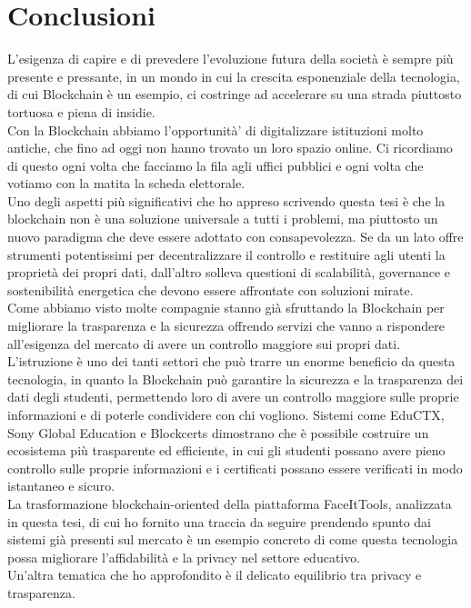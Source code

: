\chapter{Conclusioni}
L'esigenza di capire e di prevedere l'evoluzione futura della società è sempre più presente e pressante,
in un mondo in cui la crescita esponenziale della tecnologia, di cui Blockchain è un esempio, ci costringe ad accelerare su una strada piuttosto tortuosa e piena di insidie.
\\Con la Blockchain abbiamo l'opportunità' di digitalizzare istituzioni molto antiche, che fino ad oggi non hanno trovato un loro spazio online.
Ci ricordiamo di questo ogni volta che facciamo la fila agli uffici pubblici e ogni volta che votiamo con la matita la scheda elettorale.
\\Uno degli aspetti più significativi che ho appreso scrivendo questa tesi è che la blockchain non è una soluzione universale a tutti i problemi, ma piuttosto un nuovo paradigma che deve essere adottato con consapevolezza. 
Se da un lato offre strumenti potentissimi per decentralizzare il controllo e restituire agli utenti la proprietà dei propri dati, dall’altro solleva questioni di scalabilità, governance e sostenibilità energetica che devono essere affrontate con soluzioni mirate.
\\Come abbiamo visto molte compagnie stanno già sfruttando la Blockchain per migliorare la trasparenza e la sicurezza offrendo servizi che vanno a rispondere all'esigenza del mercato di avere un controllo maggiore sui propri dati.
\\L'istruzione è uno dei tanti settori che può trarre un enorme beneficio da questa tecnologia, in quanto la Blockchain può garantire la sicurezza e la trasparenza dei dati degli studenti, permettendo loro di avere un controllo maggiore sulle proprie informazioni e di poterle condividere con chi vogliono.
Sistemi come EduCTX, Sony Global Education e Blockcerts dimostrano che è possibile costruire un ecosistema più trasparente ed efficiente, in cui gli studenti possano avere pieno controllo sulle proprie informazioni e i certificati possano essere verificati in modo istantaneo e sicuro. 
\\La trasformazione blockchain-oriented della piattaforma FaceItTools, analizzata in questa tesi, di cui ho fornito una traccia da seguire prendendo spunto dai sistemi già presenti sul mercato è un esempio concreto di come questa tecnologia possa migliorare l’affidabilità e la privacy nel settore educativo.
\\Un'altra tematica che ho approfondito è il delicato equilibrio tra privacy e trasparenza. 
